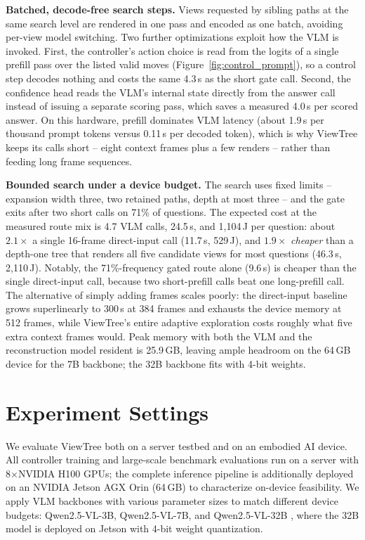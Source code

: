 \documentclass[sigconf,10pt]{acmart}
\newcommand{\system}{ViewTree\xspace}
\begin{document}
	\noindent\textbf{Batched, decode-free search steps.} Views requested by sibling paths at the same search level are rendered in one pass and encoded as one batch, avoiding per-view model switching. Two further optimizations exploit how the VLM is invoked. First, the controller's action choice is read from the logits of a single prefill pass over the listed valid moves (Figure~\ref{fig:control_prompt}), so a control step decodes nothing and costs the same 4.3\,s as the short gate call. Second, the confidence head reads the VLM's internal state directly from the answer call instead of issuing a separate scoring pass, which saves a measured 4.0\,s per scored answer. On this hardware, prefill dominates VLM latency (about 1.9\,s per thousand prompt tokens versus 0.11\,s per decoded token), which is why \system keeps its calls short -- eight context frames plus a few renders -- rather than feeding long frame sequences.

	\noindent\textbf{Bounded search under a device budget.} The search uses fixed limits -- expansion width three, two retained paths, depth at most three -- and the gate exits after two short calls on 71\% of questions. The expected cost at the measured route mix is 4.7 VLM calls, 24.5\,s, and 1{,}104\,J per question: about $2.1\times$ a single 16-frame direct-input call (11.7\,s, 529\,J), and $1.9\times$ \emph{cheaper} than a depth-one tree that renders all five candidate views for most questions (46.3\,s, 2{,}110\,J). Notably, the 71\%-frequency gated route alone (9.6\,s) is cheaper than the single direct-input call, because two short-prefill calls beat one long-prefill call. The alternative of simply adding frames scales poorly: the direct-input baseline grows superlinearly to 300\,s at 384 frames and exhausts the device memory at 512 frames, while \system's entire adaptive exploration costs roughly what five extra context frames would. Peak memory with both the VLM and the reconstruction model resident is 25.9\,GB, leaving ample headroom on the 64\,GB device for the 7B backbone; the 32B backbone fits with 4-bit weights.

	\section{Experiment Settings}
\label{sec:experiment_setting}

We evaluate ViewTree both on a server testbed and on an embodied AI device. All controller training and large-scale benchmark evaluations run on a server with 8$\times$NVIDIA H100 GPUs; the complete inference pipeline is additionally deployed on an NVIDIA Jetson AGX Orin (64\,GB) to characterize on-device feasibility. We apply VLM backbones with various parameter sizes to match different device budgets: Qwen2.5-VL-3B, Qwen2.5-VL-7B, and Qwen2.5-VL-32B \cite{bai2025qwen2}, where the 32B model is deployed on Jetson with 4-bit weight quantization.
\end{document}
